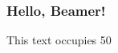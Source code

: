 \documentclass{beamer}
\begin{document}
\begin{frame}
    \frametitle{Hello, Beamer!}

    \begin{minipage}{0.5\textwidth}
        This text occupies 50%
    \end{minipage}
\end{frame}
\end{document}
